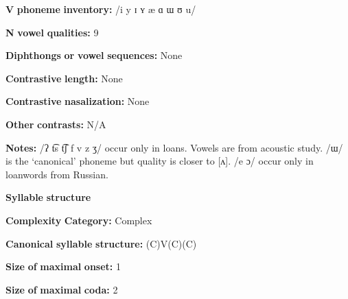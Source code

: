 \documentclass[output=paper]{langsci/langscibook}
\begin{document}
\begin{styleBody}
\textbf{V} \textbf{phoneme} \textbf{inventory:} /i y ɪ ʏ æ ɑ ɯ ʊ u/
\end{styleBody}

\begin{styleBody}
\textbf{N} \textbf{vowel} \textbf{qualities:} 9
\end{styleBody}

\begin{styleBody}
\textbf{Diphthongs} \textbf{or} \textbf{vowel} \textbf{sequences:} None
\end{styleBody}

\begin{styleBody}
\textbf{Contrastive} \textbf{length:} None
\end{styleBody}

\begin{styleBody}
\textbf{Contrastive} \textbf{nasalization:} None
\end{styleBody}

\begin{styleBody}
\textbf{Other} \textbf{contrasts:} N/A
\end{styleBody}

\begin{styleBody}
\textbf{Notes:} /ʔ t͡s t͡ʃ f v z ʒ/ occur only in loans. Vowels are from \citet{CarterRobbins2016} acoustic study. /ɯ/ is the ‘canonical’ phoneme but quality is closer to [ʌ]. /e ɔ/ occur only in loanwords from Russian.
\end{styleBody}

\begin{styleBody}
\textbf{Syllable} \textbf{structure}
\end{styleBody}

\begin{styleBody}
\textbf{Complexity} \textbf{Category:} Complex
\end{styleBody}

\begin{styleBody}
\textbf{Canonical} \textbf{syllable} \textbf{structure:} (C)V(C)(C) \citep[12-18]{Poppe1964}
\end{styleBody}

\begin{styleBody}
\textbf{Size} \textbf{of} \textbf{maximal} \textbf{onset:} 1
\end{styleBody}

\begin{styleBody}
\textbf{Size} \textbf{of} \textbf{maximal} \textbf{coda:} 2
\end{styleBody}
\end{document}
